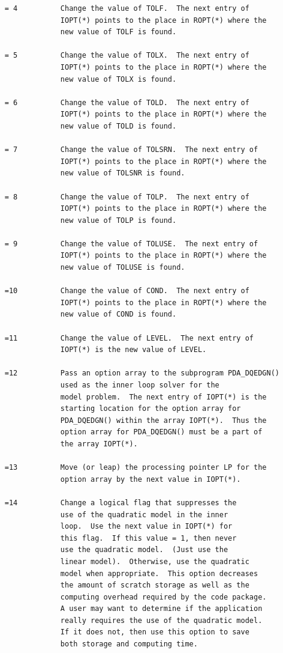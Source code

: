 \documentclass[11pt,twoside]{article}
\begin{document}
\begin{verbatim}
     = 4          Change the value of TOLF.  The next entry of
                  IOPT(*) points to the place in ROPT(*) where the
                  new value of TOLF is found.

     = 5          Change the value of TOLX.  The next entry of
                  IOPT(*) points to the place in ROPT(*) where the
                  new value of TOLX is found.

     = 6          Change the value of TOLD.  The next entry of
                  IOPT(*) points to the place in ROPT(*) where the
                  new value of TOLD is found.

     = 7          Change the value of TOLSRN.  The next entry of
                  IOPT(*) points to the place in ROPT(*) where the
                  new value of TOLSNR is found.

     = 8          Change the value of TOLP.  The next entry of
                  IOPT(*) points to the place in ROPT(*) where the
                  new value of TOLP is found.

     = 9          Change the value of TOLUSE.  The next entry of
                  IOPT(*) points to the place in ROPT(*) where the
                  new value of TOLUSE is found.

     =10          Change the value of COND.  The next entry of
                  IOPT(*) points to the place in ROPT(*) where the
                  new value of COND is found.

     =11          Change the value of LEVEL.  The next entry of
                  IOPT(*) is the new value of LEVEL.

     =12          Pass an option array to the subprogram PDA_DQEDGN()
                  used as the inner loop solver for the
                  model problem.  The next entry of IOPT(*) is the
                  starting location for the option array for
                  PDA_DQEDGN() within the array IOPT(*).  Thus the
                  option array for PDA_DQEDGN() must be a part of
                  the array IOPT(*).

     =13          Move (or leap) the processing pointer LP for the
                  option array by the next value in IOPT(*).

     =14          Change a logical flag that suppresses the
                  use of the quadratic model in the inner
                  loop.  Use the next value in IOPT(*) for
                  this flag.  If this value = 1, then never
                  use the quadratic model.  (Just use the
                  linear model).  Otherwise, use the quadratic
                  model when appropriate.  This option decreases
                  the amount of scratch storage as well as the
                  computing overhead required by the code package.
                  A user may want to determine if the application
                  really requires the use of the quadratic model.
                  If it does not, then use this option to save
                  both storage and computing time.


\end{verbatim}
\end{document}
